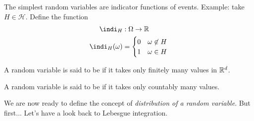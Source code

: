 \documentclass{report}
\begin{document}
\begin{remark}
	The simplest random variables are indicator functions of events.
	Example: take $H\in\mathscr{H}$. Define the function
	\begin{align*}
		\indi_H&:\Omega\rightarrow\R\\
		\indi_H(\omega)&=\begin{cases}
			0 &\omega\not\in H\\
			1 &\omega\in H
		\end{cases}
	\end{align*}
\end{remark}
\begin{remark}
	A random variable is said to be  if it takes only finitely many values in $\mathbb{R}^d$.
\end{remark}
\begin{remark}
	A random variable is said to be  if it takes only countably many values.
\end{remark}
We are now ready to define the concept of \textit{distribution of a random variable}. But first... Let's have a look back to Lebesgue integration.
\end{document}
